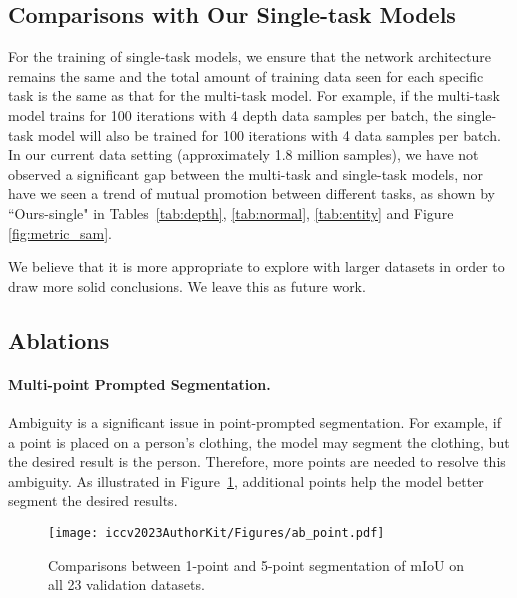 \subsection{Comparisons with Our Single-task Models}

For the training of single-task models, we ensure that the network architecture remains the same and the total amount of training data seen for each specific task is the same as that for the multi-task model. For example, if the multi-task model trains for 100 iterations with 4 depth data samples per batch, the single-task model will also be 
trained  for 100 iterations with 4 data samples per batch. In our current data setting (approximately 1.8 million samples), we have not observed a significant gap between the multi-task and single-task models, nor have we seen a trend of mutual promotion between different tasks, as shown by ``Ours-single" in Tables~\ref{tab:depth}, \ref{tab:normal}, \ref{tab:entity} and Figure \ref{fig:metric_sam}. 


We believe that it is more appropriate to explore with larger datasets in order to draw more solid conclusions.
We leave this as future work.

\subsection{Ablations}

\paragraph{Multi-point Prompted Segmentation.}
Ambiguity is a significant issue in point-prompted segmentation. For example, if a point is placed on a person’s clothing, the model may segment the clothing, but the desired result is the person. Therefore, more points are needed to resolve this ambiguity. As illustrated in Figure~\ref{fig:ab_point}, additional points help the model better segment the desired results.

\begin{figure}[htbp]
  \centering
  \texttt{[image: iccv2023AuthorKit/Figures/ab\_point.pdf]}
  \caption{
   Comparisons between 1-point and 5-point segmentation of mIoU on all 23 validation datasets.
  }
  \label{fig:ab_point}
\end{figure}

